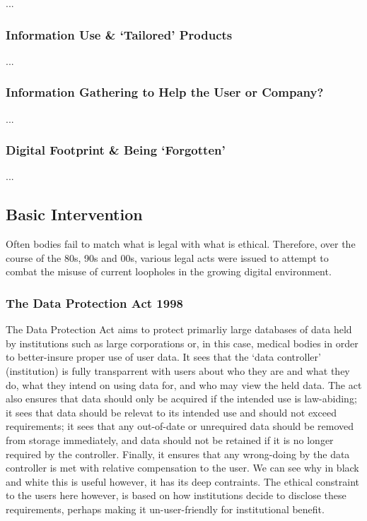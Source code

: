 \documentclass[11pt, english]{article}
\begin{document}
	...

		\subsubsection{Information Use \& `Tailored' Products}

	...

		\subsubsection{Information Gathering to Help the User or Company?}

	...

		\subsubsection{Digital Footprint \& Being `Forgotten'}

	...

	\subsection{Basic Intervention}

	Often bodies fail to match what is legal with what is ethical. Therefore, over the course of the 80s, 90s and 00s, various legal acts were issued to attempt to combat the misuse of current loopholes in the growing digital environment.

		\subsubsection{The Data Protection Act 1998}

	The Data Protection Act aims to protect primarliy large databases of data held by institutions such as large corporations or, in this case, medical bodies in order to better-insure proper use of user data. It sees that the `data controller' (institution) is fully transparrent with users about who they are and what they do, what they intend on using data for, and who may view the held data. The act also ensures that data should only be acquired if the intended use is law-abiding; it sees that data should be relevat to its intended use and should not exceed requirements; it sees that any out-of-date or unrequired data should be removed from storage immediately, and data should not be retained if it is no longer required by the controller. Finally, it ensures that any wrong-doing by the data controller is met with relative compensation to the user. We can see why in black and white this is useful however, it has its deep contraints. The ethical constraint to the users here however, is based on how institutions decide to disclose these requirements, perhaps making it un-user-friendly for institutional benefit.
\end{document}
